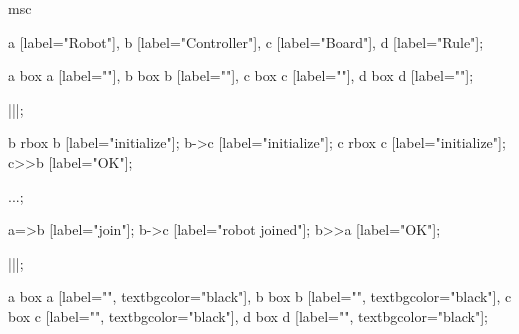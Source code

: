 \begin{msc}
msc
{

a [label="Robot"],
b [label="Controller"],
c [label="Board"],
d [label="Rule"];

a box a [label=""],
b box b [label=""],
c box c [label=""],
d box d [label=""];

|||;

b rbox b [label="initialize"];
b->c [label="initialize"];
c rbox c [label="initialize"];
c>>b [label="OK"];

...;

a=>b [label="join"];
b->c [label="robot joined"];
b>>a [label="OK"];

|||;

a box a [label="", textbgcolor="black"],
b box b [label="", textbgcolor="black"],
c box c [label="", textbgcolor="black"],
d box d [label="", textbgcolor="black"];

}
\end{msc} 